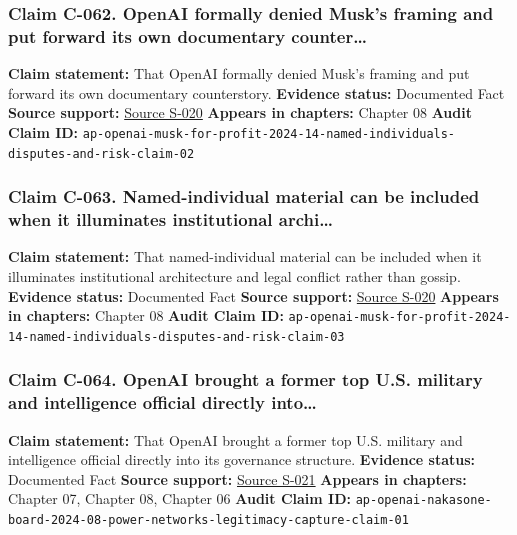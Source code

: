 \documentclass[
  american,
  11pt,
  letterpaper,
]{article}
\begin{document}
\subsubsection{Claim C-062. OpenAI formally denied Musk's framing and
put forward its own documentary
counter\ldots{}}\label{claim-c-062-openai-formally-denied-musk-s-framing-and-put-forward-its-own-documentary-counter}

\textbf{Claim statement:} That OpenAI formally denied Musk's framing and
put forward its own documentary counterstory. \textbf{Evidence status:}
Documented Fact \textbf{Source support:}
\hyperref[source-s-020-openai-says-musk-agreed-the-chatgpt-maker-should-become-a-for-profit-company]{Source
S-020} \textbf{Appears in chapters:} Chapter 08 \textbf{Audit Claim ID:}
\texttt{ap-openai-musk-for-profit-2024-14-named-individuals-disputes-and-risk-claim-02}

\subsubsection{Claim C-063. Named-individual material can be included
when it illuminates institutional
archi\ldots{}}\label{claim-c-063-named-individual-material-can-be-included-when-it-illuminates-institutional-archi}

\textbf{Claim statement:} That named-individual material can be included
when it illuminates institutional architecture and legal conflict rather
than gossip. \textbf{Evidence status:} Documented Fact \textbf{Source
support:}
\hyperref[source-s-020-openai-says-musk-agreed-the-chatgpt-maker-should-become-a-for-profit-company]{Source
S-020} \textbf{Appears in chapters:} Chapter 08 \textbf{Audit Claim ID:}
\texttt{ap-openai-musk-for-profit-2024-14-named-individuals-disputes-and-risk-claim-03}

\subsubsection{Claim C-064. OpenAI brought a former top U.S. military
and intelligence official directly
into\ldots{}}\label{claim-c-064-openai-brought-a-former-top-u-s-military-and-intelligence-official-directly-into}

\textbf{Claim statement:} That OpenAI brought a former top U.S. military
and intelligence official directly into its governance structure.
\textbf{Evidence status:} Documented Fact \textbf{Source support:}
\hyperref[source-s-021-openai-appoints-former-top-us-cyberwarrior-paul-nakasone-to-its-board-of-directors]{Source
S-021} \textbf{Appears in chapters:} Chapter 07, Chapter 08, Chapter 06
\textbf{Audit Claim ID:}
\texttt{ap-openai-nakasone-board-2024-08-power-networks-legitimacy-capture-claim-01}
\end{document}
